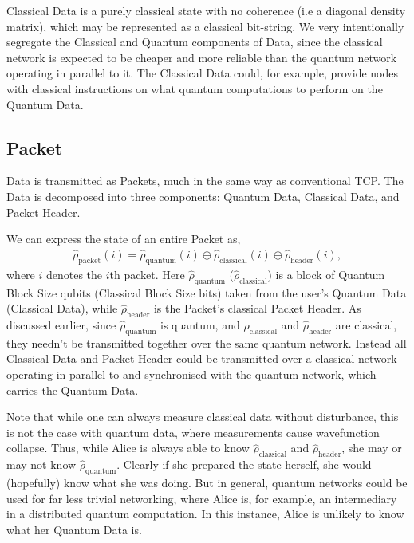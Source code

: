 \documentclass[aps,rmp,twocolumn,amsmath,amssymb,nofootinbib,superscriptaddress]{revtex4}
\begin{document}
{\sc Classical Data} is a purely classical state with no coherence (i.e a diagonal density matrix), which may be represented as a classical bit-string. We very intentionally segregate the {\sc Classical} and {\sc Quantum} components of {\sc Data}, since the classical network is expected to be cheaper and more reliable than the quantum network operating in parallel to it. The {\sc Classical Data} could, for example, provide nodes with classical instructions on what quantum computations to perform on the {\sc Quantum Data}.

%
%

\subsection{Packet}

{\sc Data} is transmitted as {\sc Packets}, much in the same way as conventional TCP. The {\sc Data} is decomposed into three components: {\sc Quantum Data}, {\sc Classical Data}, and {\sc Packet Header}.

We can express the state of an entire {\sc Packet} as,
\begin{align}
\hat\rho_\mathrm{packet}(i) = \hat\rho_\mathrm{quantum}(i) \oplus \hat\rho_\mathrm{classical}(i) \oplus \hat\rho_\mathrm{header}(i),
\end{align}
where $i$ denotes the $i$th packet. Here $\hat\rho_\mathrm{quantum}$ ($\hat\rho_\mathrm{classical}$) is a block of {\sc Quantum Block Size} qubits ({\sc Classical Block Size} bits) taken from the user's {\sc Quantum Data} ({\sc Classical Data}), while $\hat\rho_\mathrm{header}$ is the {\sc Packet's} classical {\sc Packet Header}. As discussed earlier, since $\hat\rho_\mathrm{quantum}$ is quantum, and $\hat\rho_\mathrm{classical}$ and $\hat\rho_\mathrm{header}$ are classical, they needn't be transmitted together over the same quantum network. Instead all {\sc Classical Data} and {\sc Packet Header} could be transmitted over a classical network operating in parallel to and synchronised with the quantum network, which carries the {\sc Quantum Data}.

Note that while one can always measure classical data without disturbance, this is not the case with quantum data, where measurements cause wavefunction collapse. Thus, while Alice is always able to know $\hat\rho_\mathrm{classical}$ and $\hat\rho_\mathrm{header}$, she may or may not know $\hat\rho_\mathrm{quantum}$. Clearly if she prepared the state herself, she would (hopefully) know what she was doing. But in general, quantum networks could be used for far less trivial networking, where Alice is, for example, an intermediary in a distributed quantum computation. In this instance, Alice is unlikely to know what her {\sc Quantum Data} is.
\end{document}
